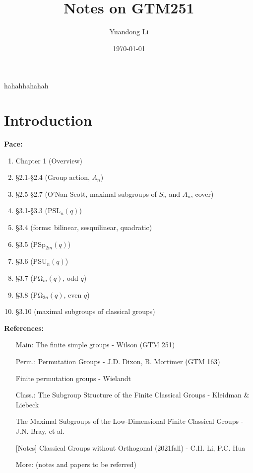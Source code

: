 \documentclass[a4,11pt]{article}
\title{Notes on GTM251}
\author{Yuandong Li}
\date{\today}
\def\PSL{\mathrm{PSL}}
\def\PSU{\mathrm{PSU}}
\def\PSp{\mathrm{PSp}}
\def\PO{\mathrm{P\Omega}}
\def\PSL{\mathrm{PSL}}
\begin{document}
\maketitle

\tableofcontents
\newpage

hahahhahahah


\section{Introduction}
\textbf{Pace: }
\begin{enumerate}[Lesson 1:]
	\item Chapter 1 (Overview)
	\item \S 2.1-\S 2.4 (Group action, $A_n$)
	\item \S 2.5-\S 2.7 (O'Nan-Scott, maximal subgroups of $S_n$ and $A_n$, cover)
	\item \S 3.1-\S 3.3 ($\PSL_n(q)$)
	\item \S 3.4 (forms: bilinear, sesquilinear, quadratic)
	\item \S 3.5 ($\PSp_{2m}(q)$)
	\item \S 3.6 ($\PSU_n(q)$)
	\item \S 3.7 ($\PO_{m}(q)$, odd $q$)
	\item \S 3.8 ($\PO_{2n}(q)$, even $q$)
	\item \S 3.10 (maximal subgroups of classical groups)
\end{enumerate}

\vline 

\noindent \textbf{References:}
\begin{itemize}
	\item[Main:] The finite simple groups - Wilson (GTM 251)
	\item[Perm.:] Permutation Groups - J.D. Dixon, B. Mortimer (GTM 163)
	\item[ ] Finite permutation groups - Wielandt
	\item[Class.:] The Subgroup Structure of the Finite Classical Groups - Kleidman \& Liebeck
	\item[ ] The Maximal Subgroups of the Low-Dimensional Finite Classical Groups - J.N. Bray, et al.
		\item[ ] [Notes] Classical Groups without Orthogonal (2021fall) - C.H. Li, P.C. Hua
	\item[More:] (notes and papers to be referred)
	\item[ ]
\end{itemize}


\newpage
\end{document}
